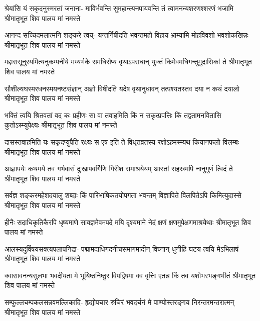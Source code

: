 

\fourlineindentedshloka
{श्रेयांसि यं सकृदनुस्मरतां जनाना-}
{माविर्भवन्ति सुमहान्त्यनपायवन्ति}
{तं त्वामनन्यशरणश्शरणं भजामि}
{श्रीमातृभूत शिव पालय मां नमस्ते} %

\fourlineindentedshloka
{आनन्द सच्चिदमलात्मनि शङ्करे त्वय्-}
{यन्तर्निषीदति भवन्तमहो विहाय}
{भ्राम्यामि मोहविवशो भवशोकखिन्नः}
{श्रीमातृभूत शिव पालय मां नमस्ते} %

\fourlineindentedshloka
{मद्दाससूनुरयमित्यनुकम्पनीये}
{मय्यर्भके समधिरोप्य वृथाऽपराधान्}
{युक्तं किमेवमधिगन्तुमुदासिकां ते}
{श्रीमातृभूत शिव पालय मां नमस्ते} %

\fourlineindentedshloka
{सौशील्यघस्मरधनस्मयनष्टसंज्ञान्}
{अज्ञो विषीदति यदेष वृथानुधावन्}
{तत्पश्यतस्तव दया न कथं दयालो}
{श्रीमातृभूत शिव पालय मां नमस्ते} %

\fourlineindentedshloka
{भक्तिं त्वयि श्रितवतां वद कः प्रहीणः}
{सा वा तवाहमिति किं न सकृत्प्रपत्तिः}
{किं तद्वतामनवितासि कुतोऽस्म्युपेक्ष्यः}
{श्रीमातृभूत शिव पालय मां नमस्ते} %

\fourlineindentedshloka
{दासस्तवाहमिति यः सकृदप्युपैति}
{रक्ष्यः स एष इति ते विधृतव्रतस्य}
{रक्षोऽहमस्म्यथ कियानफलो विलम्बः}
{श्रीमातृभूत शिव पालय मां नमस्ते} %

\fourlineindentedshloka
{आज्ञापयेः कथमये तव गर्भवासं}
{दुःखापवर्गिणि गिरीश समाश्रयेयम्}
{आस्तां सहस्रमपि नानुगुणं त्विदं ते}
{श्रीमातृभूत शिव पालय मां नमस्ते} %

\fourlineindentedshloka
{सर्वज्ञ शङ्करमहेशदयालु शब्दाः}
{किं पारिभाषिकतयोपगता भवन्तम्}
{विज्ञापिते विलपितेऽपि किमित्युदास्से}
{श्रीमातृभूत शिव पालय मां नमस्ते} %

\fourlineindentedshloka
{हीनैः सदाधिकृतिकैरपि धृष्यमाणे}
{सावज्ञमेवमपदे मयि दृश्यमाने}
{नेदं क्षणं क्षणमुपेक्षणमाश्रयेथाः}
{श्रीमातृभूत शिव पालय मां नमस्ते} %

\fourlineindentedshloka
{आलस्यदुर्विषयसक्त्यपलापनिद्रा-}
{पद्मामदाधिगदनीचसमागमादीन्}
{विघ्नान् धुनीहि घटय त्वयि मेऽभिलाषं}
{श्रीमातृभूत शिव पालय मां नमस्ते} %

\fourlineindentedshloka
{क्वासावनन्यसुलभा भवदीयता मे}
{भूयिष्ठनिष्ठुर विपद्विषमा क्व वृत्तिः}
{एतन्न किं तव यशोभरभङ्गभीतं}
{श्रीमातृभूत शिव पालय मां नमस्ते} %

\fourlineindentedshloka
{सम्फुल्लचम्पकलसन्नवमल्लिकादि-}
{हृद्योपचार रुचिरं भवदर्चनं मे}
{पाण्योस्तरङ्गय निरन्तरमन्तरात्मन्}
{श्रीमातृभूत शिव पालय मां नमस्ते} %

